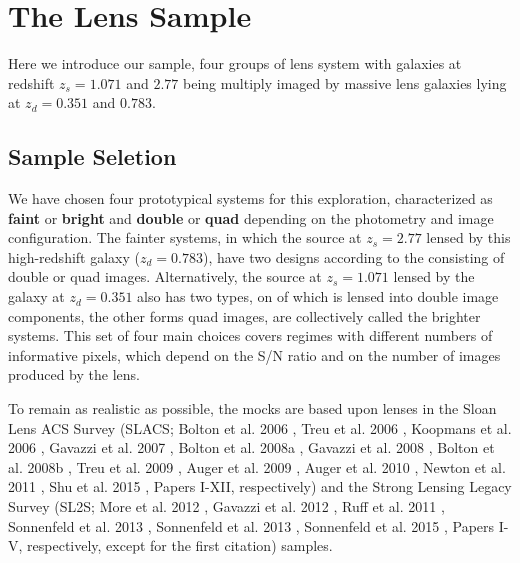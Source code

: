 \documentclass[a4paper,11pt]{article}
\begin{document}
\section{The Lens Sample}

Here we introduce our sample, four groups of lens system with galaxies at redshift $z_s = 1.071$ and $2.77$ being multiply imaged by massive lens galaxies lying at $z_d = 0.351$ and $0.783$.

\subsection{Sample Seletion}

We have chosen four prototypical systems for this exploration, characterized as \textbf{faint} or \textbf{bright} and \textbf{double} or \textbf{quad} depending on the photometry and image configuration. The fainter systems, in which the source at $z_s=2.77$ lensed by this high-redshift galaxy ($z_d=0.783$), have two designs according to the consisting of double or quad images. Alternatively, the source at $z_s=1.071$ lensed by the galaxy at $z_d=0.351$ also has two types, on of which is lensed into double image components, the other forms quad images, are collectively called the brighter systems. This set of four main choices covers regimes with different numbers of informative pixels, which depend on the S/N ratio and on the number of images produced by the lens.

To remain as realistic as possible, the mocks are based upon lenses in the Sloan Lens ACS Survey (SLACS; Bolton et al. 2006 \cite{2006ApJ...638..703B}, Treu et al. 2006 \cite{2006ApJ...640..662T}, Koopmans et al. 2006 \cite{2006ApJ...649..599K}, Gavazzi et al. 2007 \cite{2007ApJ...667..176G}, Bolton et al. 2008a \cite{2008ApJ...682..964B}, Gavazzi et al. 2008 \cite{2008ApJ...677.1046G}, Bolton et al. 2008b \cite{2008ApJ...684..248B}, Treu et al. 2009 \cite{2009ApJ...690..670T}, Auger et al. 2009 \cite{2009ApJ...705.1099A}, Auger et al. 2010 \cite{2010ApJ...724..511A}, Newton et al. 2011 \cite{2011ApJ...734..104N}, Shu et al. 2015 \cite{2014arXiv1407.2240S}, Papers I-XII, respectively) and the Strong Lensing Legacy Survey (SL2S; More et al. 2012 \cite{2012ApJ...749...38M}, Gavazzi et al. 2012 \cite{2012ApJ...761..170G}, Ruff et al. 2011 \cite{2011ApJ...727...96R}, Sonnenfeld et al. 2013 \cite{2013ApJ...777...97S}, Sonnenfeld et al. 2013 \cite{2013ApJ...777...98S}, Sonnenfeld et al. 2015 \cite{2015ApJ...800...94S}, Papers I-V, respectively, except for the first citation) samples. 
\end{document}
